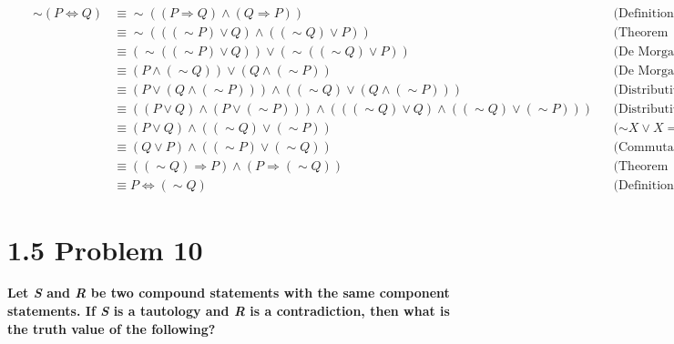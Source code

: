 \documentclass[10pt]{article}
\begin{document}
\begin{enumerate}[label=(\alph*)]
    \begin{align*}
        && \sim (P \Leftrightarrow Q) &\equiv \sim ((P \Rightarrow Q) \wedge (Q \Rightarrow P)) &&
        \text{(Definition of a biconditional)} \\
        && &\equiv \sim (((\sim P) \vee Q) \wedge ((\sim Q) \vee P)) && \text{(Theorem 1.48)} \\
        && &\equiv (\sim ((\sim P) \vee Q)) \vee (\sim ((\sim Q) \vee P)) &&
        \text{(De Morgan's Law)} \\
        && &\equiv (P \wedge (\sim Q)) \vee (Q \wedge (\sim P)) && \text{(De Morgan's Law)} \\
        && &\equiv (P \vee (Q \wedge (\sim P))) \wedge ((\sim Q) \vee (Q \wedge (\sim P))) &&
        \text{(Distributive property)} \\
        && &\equiv ((P \vee Q) \wedge (P \vee (\sim P))) \wedge (((\sim Q) 
        \vee Q) \wedge ((\sim Q) \vee (\sim P))) && \text{(Distributive property)} \\
        && &\equiv (P \vee Q) \wedge ((\sim Q) \vee (\sim P)) && \text{($\sim X \vee X = T$)} \\
        && &\equiv (Q \vee P) \wedge ((\sim P) \vee (\sim Q)) && \text{(Commutative property)} \\
        && &\equiv ((\sim Q) \Rightarrow P) \wedge (P \Rightarrow (\sim Q)) &&
        \text{(Theorem 1.48)} \\
        && &\equiv P \Leftrightarrow (\sim Q) && \text{(Definition of a biconditional)}
    \end{align*}

\end{enumerate}



\section{1.5 Problem 10}
\textbf{Let \textit{S} and \textit{R} be two compound statements with the same
component statements. If \textit{S} is a tautology and \textit{R} is a contradiction,
then what is the truth value of the following?}
\end{document}
